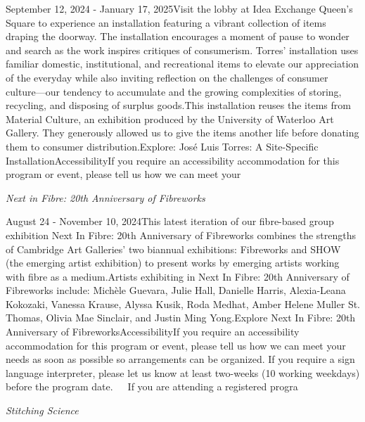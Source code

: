 \documentclass[letterpaper, 10pt]{article}
\newcommand{\subtitle}[1]{\textit{\large #1}\vspace{0.5em}}
\newcommand{\articlecontent}[1]{\small #1\vspace{1em}}
\begin{document}
\begin{multicols}{2}
{September 12, 2024 - January 17, 2025Visit the lobby at Idea Exchange Queen's Square to experience an installation featuring a vibrant collection of items draping the doorway. The installation encourages a moment of pause to wonder and search as the work inspires critiques of consumerism. Torres’ installation uses familiar domestic, institutional, and recreational items to elevate our appreciation of the everyday while also inviting reflection on the challenges of consumer culture—our tendency to accumulate and the growing complexities of storing, recycling, and disposing of surplus goods.This installation reuses the items from Material Culture, an exhibition produced by the University of Waterloo Art Gallery. They generously allowed us to give the items another life before donating them to consumer distribution.Explore: José Luis Torres: A Site-Specific InstallationAccessibilityIf you require an accessibility accommodation for this program or event, please tell us how we can meet your
}
\vspace{10px}

\subtitle{Next in Fibre: 20th Anniversary of Fibreworks}

\articlecontent{

\qrcode[height=1.5cm]{https://ideaexchange.libnet.info/event/11807131}
\vspace{10px}

August 24 - November 10, 2024This latest iteration of our fibre-based group exhibition Next In Fibre: 20th Anniversary of Fibreworks combines the strengths of Cambridge Art Galleries’ two biannual exhibitions: Fibreworks and SHOW (the emerging artist exhibition) to present works by emerging artists working with fibre as a medium.Artists exhibiting in Next In Fibre: 20th Anniversary of Fibreworks include: Michèle Guevara, Julie Hall, Danielle Harris, Alexia-Leana Kokozaki, Vanessa Krause, Alyssa Kusik, Roda Medhat, Amber Helene Muller St. Thomas, Olivia Mae Sinclair, and Justin Ming Yong.Explore Next In Fibre: 20th Anniversary of FibreworksAccessibilityIf you require an accessibility accommodation for this program or event, please tell us how we can meet your needs as soon as possible so arrangements can be organized. If you require a sign language interpreter, please let us know at least two-weeks (10 working weekdays) before the program date.   If you are attending a registered progra
}
\vspace{10px}

\subtitle{Stitching Science}

\articlecontent{

}
\end{multicols}
\end{document}
